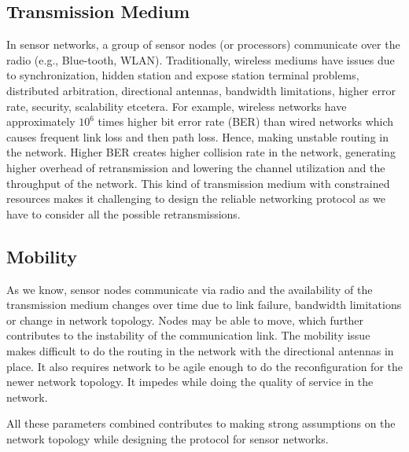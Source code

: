 	\subsection{Transmission Medium}
		In sensor networks, a group of sensor nodes (or processors) communicate over the radio (e.g., Blue-tooth, WLAN).
		Traditionally, wireless mediums have issues due to synchronization, hidden station and expose station terminal problems, distributed arbitration, directional antennas, bandwidth limitations, higher error rate, security, scalability etcetera.
		For example, wireless networks have approximately $10^6$ times higher bit error rate (BER) than wired networks which causes frequent link loss and then path loss. 
		Hence, making unstable routing in the network.
		Higher BER creates higher collision rate in the network, generating higher overhead of retransmission and lowering the channel utilization and the throughput of the network.
		This kind of transmission medium with constrained resources makes it challenging to design the reliable networking protocol as we have to consider all the possible retransmissions.

	\subsection{Mobility}
		As we know, sensor nodes communicate via radio and the availability of the transmission medium changes over time due to link failure, bandwidth limitations or change in network topology.
		Nodes may be able to move, which further contributes to the instability of the communication link.
		The mobility issue makes difficult to do the routing in the network with the directional antennas in place.
		It also requires network to be agile enough to do the reconfiguration for the newer network topology.
		It impedes while doing the quality of service in the network. 
		
	All these parameters combined contributes to making strong assumptions on the network topology while designing the protocol for sensor networks.
